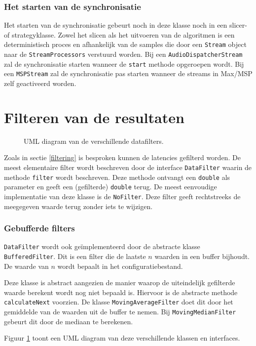 \subsubsection{Het starten van de synchronisatie}

Het starten van de synchronisatie gebeurt noch in deze klasse noch in een slicer- of \mbox{strategyklasse}. Zowel het slicen als het uitvoeren van de algoritmen is een deterministisch proces en afhankelijk van de samples die door een \texttt{Stream} object naar de \texttt{StreamProcessors} verstuurd worden. Bij een \texttt{AudioDispatcherStream} zal de synchronisatie starten wanneer de \texttt{start} methode opgeroepen wordt. Bij een \texttt{MSPStream} zal de synchronisatie pas starten wanneer de streams in Max/MSP zelf geactiveerd worden.

\section*{Filteren van de resultaten}
\label{filterontwerp}

\begin{figure}[h!]
	\captionsetup{width=0.7\textwidth}
	\caption{UML diagram van de verschillende datafilters.}
	\begin{center}
		\advance\parskip0.3cm
		
	\end{center}
	\label{filterUML}
\end{figure}

Zoals in sectie \ref{filtering} is besproken kunnen de latencies gefilterd worden. De meest elementaire filter wordt beschreven door de interface \texttt{DataFilter} waarin de methode \texttt{filter} wordt beschreven. Deze methode ontvangt een \texttt{double} als parameter en geeft een (gefilterde) \texttt{double} terug. De meest eenvoudige implementatie van deze klasse is de \texttt{NoFilter}. Deze filter geeft rechtstreeks de meegegeven waarde terug zonder iets te wijzigen.

\subsubsection{Gebufferde filters}

\texttt{DataFilter} wordt ook geïmplementeerd door de abstracte klasse \texttt{BufferedFilter}. Dit is een filter die de laatste $ n $ waarden in een buffer bijhoudt. De waarde van $ n $ wordt bepaalt in het configuratiebestand. 

Deze klasse is abstract aangezien de manier waarop de uiteindelijk gefilterde waarde \mbox{berekent} wordt nog niet bepaald is. Hiervoor is de abstracte methode \texttt{calculateNext} voorzien. De klasse \texttt{MovingAverageFilter} doet dit door het gemiddelde van de waarden uit de buffer te nemen. Bij \texttt{MovingMedianFilter} gebeurt dit door de mediaan te berekenen.

Figuur \ref{filterUML} toont een UML diagram van deze verschillende klassen en interfaces.